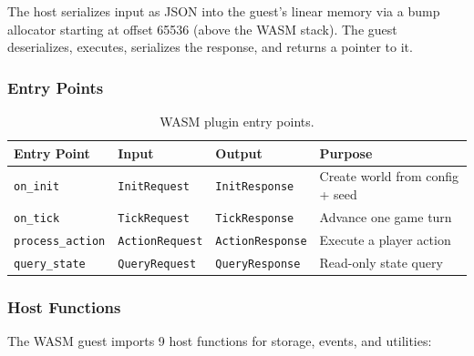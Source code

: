 \documentclass[a4paper, 11pt]{article}
\begin{document}
The host serializes input as JSON into the guest's linear memory via a bump
allocator starting at offset 65536 (above the WASM stack). The guest
deserializes, executes, serializes the response, and returns a pointer to it.

\subsubsection{Entry Points}

\begin{table}[htbp]
\centering
\caption{WASM plugin entry points.}
\label{tab:entry-points}
\begin{tabular}{@{}llll@{}}
\toprule
\textbf{Entry Point} & \textbf{Input} & \textbf{Output} & \textbf{Purpose} \\
\midrule
\texttt{on\_init}        & \texttt{InitRequest}   & \texttt{InitResponse}   & Create world from config + seed \\
\texttt{on\_tick}         & \texttt{TickRequest}    & \texttt{TickResponse}    & Advance one game turn \\
\texttt{process\_action}  & \texttt{ActionRequest}  & \texttt{ActionResponse}  & Execute a player action \\
\texttt{query\_state}     & \texttt{QueryRequest}   & \texttt{QueryResponse}   & Read-only state query \\
\bottomrule
\end{tabular}
\end{table}

\subsubsection{Host Functions}

The WASM guest imports 9 host functions for storage, events, and utilities:
\end{document}
